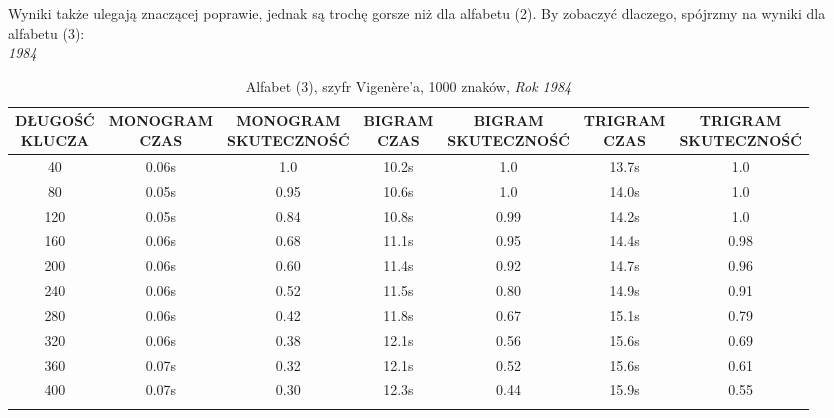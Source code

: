 \documentclass[a4paper]{article}
\theoremstyle{defn}
\theoremstyle{theorem}
\theoremstyle{lemma}
\theoremstyle{cor}
\theoremstyle{fact}
\begin{document}
Wyniki także ulegają znaczącej poprawie, jednak są trochę gorsze niż dla alfabetu (2). By zobaczyć dlaczego, spójrzmy na wyniki dla alfabetu (3):\\
\textit{1984}
\begin{center}\begin{small}\begin{longtable}{|c|c|c|c|c|c|c|} 
\hline \makecell{DŁUGOŚĆ\\KLUCZA} &  \makecell{MONOGRAM\\CZAS} & \makecell{MONOGRAM\\SKUTECZNOŚĆ} & \makecell{BIGRAM\\CZAS} &  \makecell{BIGRAM\\SKUTECZNOŚĆ} & \makecell{TRIGRAM\\CZAS} & \makecell{TRIGRAM\\SKUTECZNOŚĆ}\\ \hline 
40 & 0.06s & 1.0 & 10.2s & 1.0 & 13.7s & 1.0 \\ \hline 
80 & 0.05s & 0.95 & 10.6s & 1.0 & 14.0s & 1.0 \\ \hline 
120 & 0.05s & 0.84 & 10.8s & 0.99 & 14.2s & 1.0 \\ \hline 
160 & 0.06s & 0.68 & 11.1s & 0.95 & 14.4s & 0.98 \\ \hline 
200 & 0.06s & 0.60 & 11.4s & 0.92 & 14.7s & 0.96 \\ \hline 
240 & 0.06s & 0.52 & 11.5s & 0.80 & 14.9s & 0.91 \\ \hline 
280 & 0.06s & 0.42 & 11.8s & 0.67 & 15.1s & 0.79 \\ \hline 
320 & 0.06s & 0.38 & 12.1s & 0.56 & 15.6s & 0.69 \\ \hline 
360 & 0.07s & 0.32 & 12.1s & 0.52 & 15.6s & 0.61 \\ \hline 
400 & 0.07s & 0.30 & 12.3s & 0.44 & 15.9s & 0.55 \\ \hline 
\caption{Alfabet (3), szyfr Vigenère'a, 1000 znaków, \textit{Rok 1984}}
\end{longtable}\end{small}\end{center} 
\end{document}
